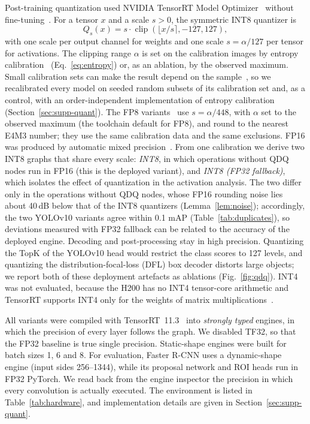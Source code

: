\documentclass[pdflatex,sn-mathphys-num]{sn-jnl}%
\theoremstyle{thmstyleone}%
\theoremstyle{thmstyletwo}%
\theoremstyle{thmstylethree}%
\begin{document}
Post-training quantization used NVIDIA TensorRT Model Optimizer~\cite{modelopt} without fine-tuning~\cite{jacob2018quantization,krishnamoorthi2018whitepaper,nagel2021whitepaper}. For a tensor $x$ and a scale $s>0$, the symmetric INT8 quantizer is
\begin{equation}
Q_s(x)=s\cdot\operatorname{clip}\!\left(\lfloor x/s\rceil,-127,127\right),\label{eq:int8}
\end{equation}
with one scale per output channel for weights and one scale $s=\alpha/127$ per tensor for activations. The clipping range $\alpha$ is set on the calibration images by entropy calibration~\cite{migacz2017tensorrt} (Eq.~\eqref{eq:entropy}) or, as an ablation, by the observed maximum. Small calibration sets can make the result depend on the sample~\cite{hubara2021accurate}, so we recalibrated every model on seeded random subsets of its calibration set and, as a control, with an order-independent implementation of entropy calibration (Section~\ref{sec:supp-quant}). The FP8 variants~\cite{micikevicius2022fp8} use $s=\alpha/448$, with $\alpha$ set to the observed maximum (the toolchain default for FP8), and round to the nearest E4M3 number; they use the same calibration data and the same exclusions. FP16 was produced by automatic mixed precision~\cite{micikevicius2018mixed}. From one calibration we derive two INT8 graphs that share every scale: \emph{INT8}, in which operations without QDQ nodes run in FP16 (this is the deployed variant), and \emph{INT8 (FP32 fallback)}, which isolates the effect of quantization in the activation analysis. The two differ only in the operations without QDQ nodes, whose FP16 rounding noise lies about 40\,dB below that of the INT8 quantizers (Lemma~\ref{lem:noise}); accordingly, the two YOLOv10 variants agree within 0.1 mAP (Table~\ref{tab:duplicates}), so deviations measured with FP32 fallback can be related to the accuracy of the deployed engine. Decoding and post-processing stay in high precision. Quantizing the TopK of the YOLOv10 head would restrict the class scores to 127 levels, and quantizing the distribution-focal-loss (DFL) box decoder distorts large objects; we report both of these deployment artefacts as ablations (Fig.~\ref{fig:qdq}). INT4 was not evaluated, because the H200 has no INT4 tensor-core arithmetic and TensorRT supports INT4 only for the weights of matrix multiplications~\cite{nvidia2023h200,tensorrt2026quantized}.

All variants were compiled with TensorRT~11.3~\cite{tensorrt} into \emph{strongly typed} engines, in which the precision of every layer follows the graph. We disabled TF32, so that the FP32 baseline is true single precision. Static-shape engines were built for batch sizes 1, 6 and 8. For evaluation, Faster R-CNN uses a dynamic-shape engine (input sides 256--1344), while its proposal network and ROI heads run in FP32 PyTorch. We read back from the engine inspector the precision in which every convolution is actually executed. The environment is listed in Table~\ref{tab:hardware}, and implementation details are given in Section~\ref{sec:supp-quant}.
\end{document}
